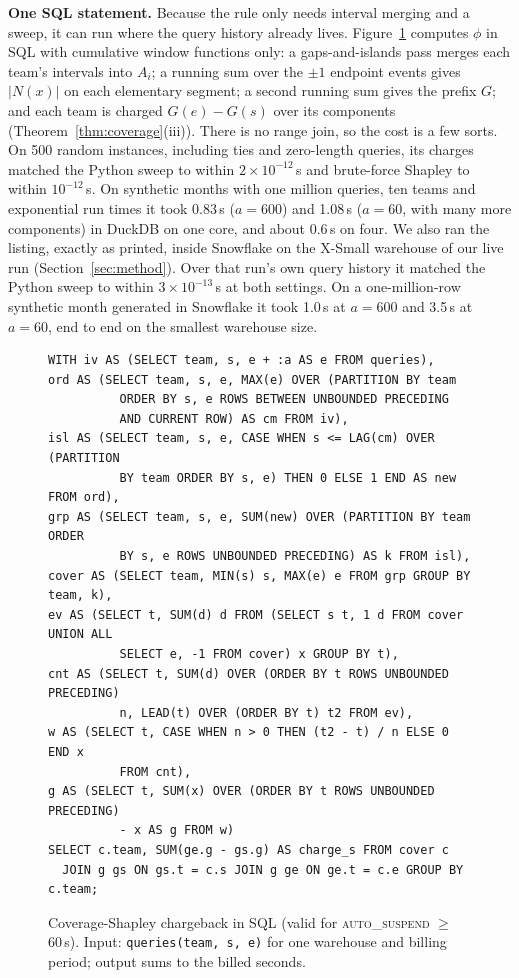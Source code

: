 \documentclass[sigconf]{acmart}
\newcommand{\autos}{\textsc{auto\_suspend}}
\begin{document}
\textbf{One SQL statement.} Because the rule only needs interval merging and a sweep, it can run where the query history
already lives. Figure~\ref{lst:sql} computes $\phi$ in SQL with cumulative window functions only: a gaps-and-islands pass
merges each team's intervals into $A_i$; a running sum over the $\pm1$ endpoint events gives $|N(x)|$ on each elementary
segment; a second running sum gives the prefix $G$; and each team is charged $G(e) - G(s)$ over its components
(Theorem~\ref{thm:coverage}(iii)). There is no range join, so the cost is a few sorts. On 500 random instances, including
ties and zero-length queries, its charges matched the Python sweep to within $2\times10^{-12}$\,s and brute-force Shapley to
within $10^{-12}$\,s. On synthetic months with one million queries, ten teams and exponential run times it took 0.83\,s
($a=600$) and 1.08\,s ($a=60$, with many more components) in DuckDB on one core, and about 0.6\,s on four. We also ran the listing, exactly as printed, inside Snowflake on
the X-Small warehouse of our live run (Section~\ref{sec:method}). Over that run's own query history it matched the Python
sweep to within $3\times10^{-13}$\,s at both settings. On a one-million-row synthetic month generated in Snowflake it took
1.0\,s at $a = 600$ and 3.5\,s at $a = 60$, end to end on the smallest warehouse size.

\begin{figure}[t]
\begin{lstlisting}
WITH iv AS (SELECT team, s, e + :a AS e FROM queries),
ord AS (SELECT team, s, e, MAX(e) OVER (PARTITION BY team
          ORDER BY s, e ROWS BETWEEN UNBOUNDED PRECEDING
          AND CURRENT ROW) AS cm FROM iv),
isl AS (SELECT team, s, e, CASE WHEN s <= LAG(cm) OVER (PARTITION
          BY team ORDER BY s, e) THEN 0 ELSE 1 END AS new FROM ord),
grp AS (SELECT team, s, e, SUM(new) OVER (PARTITION BY team ORDER
          BY s, e ROWS UNBOUNDED PRECEDING) AS k FROM isl),
cover AS (SELECT team, MIN(s) s, MAX(e) e FROM grp GROUP BY team, k),
ev AS (SELECT t, SUM(d) d FROM (SELECT s t, 1 d FROM cover UNION ALL
          SELECT e, -1 FROM cover) x GROUP BY t),
cnt AS (SELECT t, SUM(d) OVER (ORDER BY t ROWS UNBOUNDED PRECEDING)
          n, LEAD(t) OVER (ORDER BY t) t2 FROM ev),
w AS (SELECT t, CASE WHEN n > 0 THEN (t2 - t) / n ELSE 0 END x
          FROM cnt),
g AS (SELECT t, SUM(x) OVER (ORDER BY t ROWS UNBOUNDED PRECEDING)
          - x AS g FROM w)
SELECT c.team, SUM(ge.g - gs.g) AS charge_s FROM cover c
  JOIN g gs ON gs.t = c.s JOIN g ge ON ge.t = c.e GROUP BY c.team;
\end{lstlisting}
\caption{Coverage-Shapley chargeback in SQL (valid for \autos{} $\ge$ 60\,s). Input: \texttt{queries(team, s, e)} for one
warehouse and billing period; output sums to the billed seconds.}
\label{lst:sql}
\end{figure}
\end{document}
